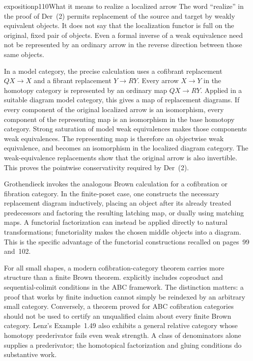 \begin{dcomment}{exposition}{p110}{What it means to realize a localized arrow}
The word ``realize'' in the proof of Der~(2) permits replacement of the source and target by weakly equivalent objects. It does not say that the localization functor is full on the original, fixed pair of objects. Even a formal inverse of a weak equivalence need not be represented by an ordinary arrow in the reverse direction between those same objects.

In a model category, the precise calculation uses a cofibrant replacement $QX\to X$ and a fibrant replacement $Y\to RY$. Every arrow $X\to Y$ in the homotopy category is represented by an ordinary map $QX\to RY$. Applied in a suitable diagram model category, this gives a map of replacement diagrams. If every component of the original localized arrow is an isomorphism, every component of the representing map is an isomorphism in the base homotopy category. Strong saturation of model weak equivalences makes those components weak equivalences. The representing map is therefore an objectwise weak equivalence, and becomes an isomorphism in the localized diagram category. The weak-equivalence replacements show that the original arrow is also invertible. This proves the pointwise conservativity required by Der~(2).

Grothendieck invokes the analogous Brown calculation for a cofibration or fibration category. In the finite-poset case, one constructs the necessary replacement diagram inductively, placing an object after its already treated predecessors and factoring the resulting latching map, or dually using matching maps. A functorial factorization can instead be applied directly to natural transformations; functoriality makes the chosen middle objects into a diagram. This is the specific advantage of the functorial constructions recalled on pages~99 and~102.

For all small shapes, a modern cofibration-category theorem carries more structure than a finite Brown theorem. \citet[Definition~1.5 and Warning~1.7]{Lenz2018} explicitly includes coproduct and sequential-colimit conditions in the ABC framework. The distinction matters: a proof that works by finite induction cannot simply be reindexed by an arbitrary small category. Conversely, a theorem proved for ABC cofibration categories should not be used to certify an unqualified claim about every finite Brown category. Lenz's Example~1.49 also exhibits a general relative category whose homotopy prederivator fails even weak strength. A class of denominators alone supplies a prederivator; the homotopical factorization and gluing conditions do substantive work.
\end{dcomment}

